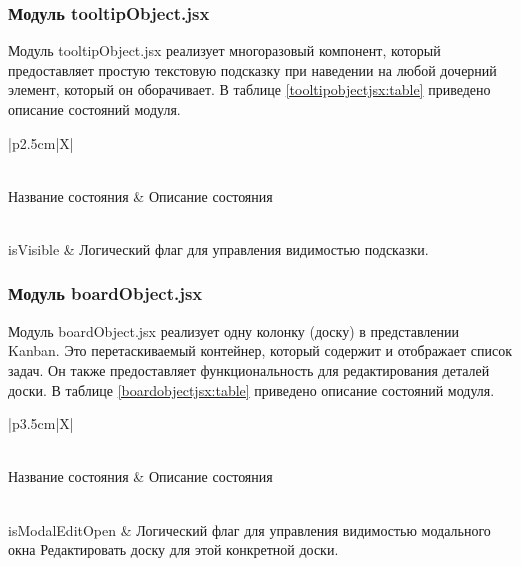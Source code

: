 \subsubsection{Модуль tooltipObject.jsx}
Модуль tooltipObject.jsx реализует многоразовый компонент, который предоставляет простую текстовую подсказку при наведении на любой дочерний элемент, который он оборачивает. В таблице \ref{tooltipobjectjsx:table} приведено описание состояний модуля.

\begin{xltabular}{\textwidth}{|p{2.5cm}|X|}
	\caption{Описание состояний, используемых в tooltipObject.jsx\label{tooltipobjectjsx:table}}\\
	\hline \centrow \setlength{\baselineskip}{0.7\baselineskip} Название состояния & \centrow \setlength{\baselineskip}{0.7\baselineskip} Описание состояния \\\hline
	\endfirsthead
	\caption*{Продолжение таблицы \ref{tooltipobjectjsx:table}}\\ \hline
	\finishhead
	isVisible & Логический флаг для управления видимостью подсказки. \\ \hline
\end{xltabular}

\subsubsection{Модуль boardObject.jsx}
Модуль boardObject.jsx реализует одну колонку (доску) в представлении Kanban. Это перетаскиваемый контейнер, который содержит и отображает список задач. Он также предоставляет функциональность для редактирования деталей доски. В таблице \ref{boardobjectjsx:table} приведено описание состояний модуля.

\begin{xltabular}{\textwidth}{|p{3.5cm}|X|}
	\caption{Описание состояний, используемых в boardObject.jsx\label{boardobjectjsx:table}}\\
	\hline \centrow \setlength{\baselineskip}{0.7\baselineskip} Название состояния & \centrow \setlength{\baselineskip}{0.7\baselineskip} Описание состояния \\\hline
	\endfirsthead
	\caption*{Продолжение таблицы \ref{boardobjectjsx:table}}\\ \hline
	\finishhead
	isModalEditOpen & Логический флаг для управления видимостью модального окна Редактировать доску для этой конкретной доски. \\ \hline
\end{xltabular}

